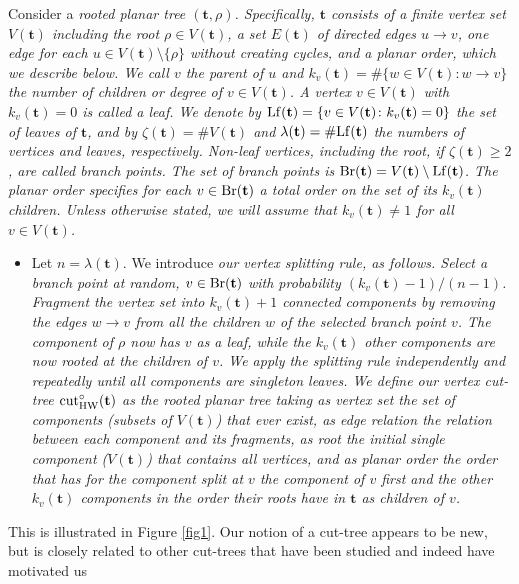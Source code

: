 \documentclass[11pt,a4paper]{article}
\newcommand{\ft}{\mathbf{t}}
\newcommand{\ourcut}{{\rm cut}_{\rm HW}^\circ}
\begin{document}
Consider a \em rooted planar tree \em $(\ft,\rho)$. Specifically, $\ft$ consists of a finite vertex set $V(\ft)$ including the \em root \em $\rho\in V(\ft)$, a set
$E(\ft)$ of directed edges $u\rightarrow v$, one edge for each $u\in V(\ft)\setminus\{\rho\}$ without creating cycles, and a planar order, which we describe below. We
call $v$ the \em parent \em of $u$ and $k_v(\ft)=\#\{w\in V(\ft)\colon w\rightarrow v\}$ the \em number of children \em or \em degree \em of $v\in V(\ft)$. A vertex $v\in V(\ft)$ with
$k_v(\ft)=0$ is called a \em leaf\em. We denote by ${\rm Lf}(\ft)=\{v\in V(\ft)\colon k_v(\ft)=0\}$ the set of leaves of $\ft$, and by $\zeta(\ft)=\#V(\ft)$ and
$\lambda(\ft)=\#{\rm Lf}(\ft)$ the numbers of vertices and leaves, respectively. Non-leaf vertices, including the root, if $\zeta(\ft)\ge 2$, are called \em branch
points\em. The set of branch points is ${\rm Br}(\ft)=V(\ft)\setminus{\rm Lf}(\ft)$. The \em planar order \em specifies for each $v\in{\rm Br}(\ft)$ a total order on the
set of its $k_v(\ft)$ children. Unless otherwise stated, we will assume that $k_v(\ft)\neq 1$ for all $v\in V(\ft)$.
\begin{itemize}\item
Let $n=\lambda(\ft)$. We introduce \em our vertex splitting rule\em, as follows. Select a branch point at random, $v\in{\rm Br}(\ft)$ with probability
$(k_v(\ft)-1)/(n-1)$. Fragment the vertex set into $k_v(\ft)+1$ connected components by removing
the edges $w\rightarrow v$ from all the children $w$ of the selected branch point $v$. The component of $\rho$ now has $v$ as a leaf, while the $k_v(\ft)$ other components
are now rooted at the children of $v$.
We apply the splitting rule independently and repeatedly until all components are singleton leaves. We define \em our vertex cut-tree \em
$\ourcut(\ft)$ as the rooted planar tree taking as vertex set the set of components (subsets of $V(\ft)$) that ever exist, as edge relation the relation
between each component and its fragments, as root the initial single component ($V(\ft)$) that contains all vertices, and as planar order the order that has for the component split at $v$ the component of $v$ first and the other $k_v(\ft)$
components in the order their roots have in $\ft$ as children of $v$.
\end{itemize}
This is illustrated in Figure \ref{fig1}. Our notion of a cut-tree appears to be new, but is closely related to other cut-trees that have been studied and indeed have motivated us
\end{document}

